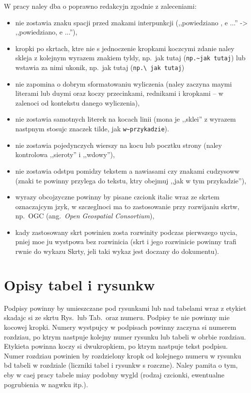 W pracy naley dba o poprawno redakcyjn zgodnie z zaleceniami:
\begin{itemize}
\item nie zostawia znaku spacji przed znakami interpunkcji (,,powiedziano , e ...'' -> ,,powiedziano, e ...''),
\item kropki po skrtach, ktre nie s jednoczenie kropkami koczcymi zdanie naley skleja z kolejnym wyrazem znakiem tyldy, np.~jak tutaj (\verb?np.~jak tutaj?) lub wstawia za nimi ukonik, np.\ jak tutaj (\verb?np.\ jak tutaj?)
\item nie zapomina o dobrym sformatowaniu wyliczenia (naley zaczyna maymi literami lub duymi oraz koczy przecinkami, rednikami i kropkami -- w zalenoci od kontekstu danego wyliczenia),
\item nie zostawia samotnych literek na kocach linii  (mona je ,,sklei'' z wyrazem nastpnym stosujc znaczek tilde, jak \verb+w~przykadzie+).
\item nie zostawia pojedynczych wierszy na kocu lub pocztku strony (naley kontrolowa ,,sieroty'' i ,,wdowy''),
\item nie zostawia odstpu pomidzy tekstem a nawiasami czy znakami cudzysoww (znaki te powinny przylega do tekstu, ktry obejmuj ,,jak w tym przykadzie''),
\item wyrazy obcojzyczne powinny by pisane czcionk italic wraz ze skrtem oznaczajcym jzyk, w szczeglnoci ma to zastosowanie przy rozwijaniu skrtw, np.~OGC (ang.~\emph{Open Geospatial Consortium}),
\item kady zastosowany skrt powinien zosta rozwinity podczas pierwszego uycia, pniej moe ju wystpowa bez rozwinicia (skrt i jego rozwinicie powinny trafi rwnie do wykazu Skrty, jeli taki wykaz jest doczany do dokumentu). 
\end{itemize}

\section{Opisy tabel i rysunkw}
Podpisy powinny by umieszczane pod rysunkami lub nad tabelami wraz z etykiet skadajc si ze skrtu Rys.\ lub Tab.\ oraz numeru. Podpisy te nie powinny mie kocowej kropki. Numery wystpujcy w podpisach powinny zaczyna si numerem rozdziau, po ktrym nastpuje kolejny numer rysunku lub tabeli w obrbie rozdziau. Etykieta powinna koczy si dwukropkiem, po ktrym nastpuje tekst podpisu. Numer rozdziau powinien by rozdzielony kropk od kolejnego numeru w rysunku bd tabeli w rozdziale (liczniki tabel i rysunkw s rozczne). Naley pamita o tym, eby w caej pracy tabele miay podobny wygld (rodzaj czcionki, ewentualne pogrubienia w nagwku itp.). %

